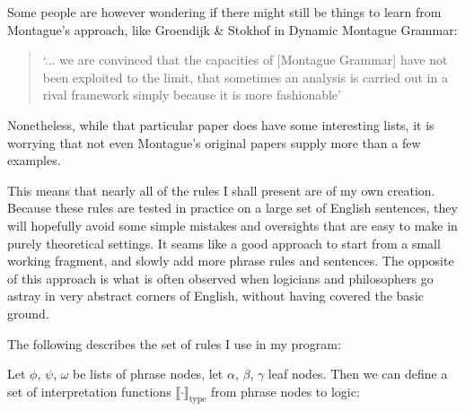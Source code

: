 \documentclass[12pt]{article}
\begin{document}
Some people are however wondering if there might still be things to learn from Montague's approach, like Groendijk \& Stokhof in Dynamic Montague Grammar\cite{groenendijk1990dynamic}:
\begin{quotation}
`... we are convinced that the capacities of [Montague Grammar] have not been exploited to the limit, that sometimes an analysis is carried out in a rival framework simply because it is more fashionable'
\end{quotation}

Nonetheless, while that particular paper does have some interesting lists, it is worrying that not even Montague's original papers supply more than a few examples.

This means that nearly all of the rules I shall present are of my own creation. Because these rules are tested in practice on a large set of English sentences, they will hopefully avoid some simple mistakes and oversights that are easy to make in purely theoretical settings. It seams like a good approach to start from a small working fragment, and slowly add more phrase rules and sentences. The opposite of this approach is what is often observed when logicians and philosophers go astray in very abstract corners of English, without having covered the basic ground.

The following describes the set of rules I use in my program:

Let $\phi$, $\psi$, $\omega$ be lists of phrase nodes, let $\alpha$, $\beta$, $\gamma$ leaf nodes.
Then we can define a set of interpretation functions $\llbracket\cdot\rrbracket_\text{type}$ from phrase nodes to logic:
\end{document}

